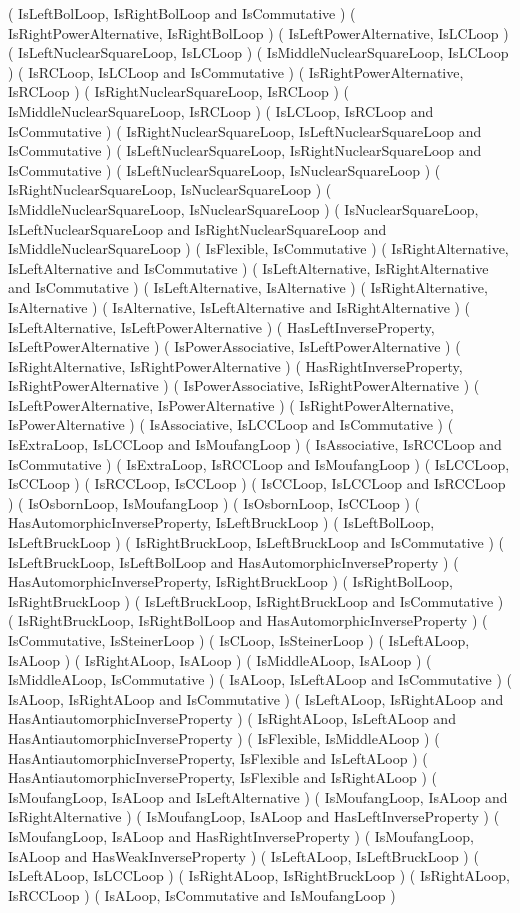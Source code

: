 ( IsLeftBolLoop, IsRightBolLoop and IsCommutative )
( IsRightPowerAlternative, IsRightBolLoop )
( IsLeftPowerAlternative, IsLCLoop )
( IsLeftNuclearSquareLoop, IsLCLoop )
( IsMiddleNuclearSquareLoop, IsLCLoop )
( IsRCLoop, IsLCLoop and IsCommutative )
( IsRightPowerAlternative, IsRCLoop )
( IsRightNuclearSquareLoop, IsRCLoop )
( IsMiddleNuclearSquareLoop, IsRCLoop )
( IsLCLoop, IsRCLoop and IsCommutative )
( IsRightNuclearSquareLoop, IsLeftNuclearSquareLoop and IsCommutative )
( IsLeftNuclearSquareLoop, IsRightNuclearSquareLoop and IsCommutative )
( IsLeftNuclearSquareLoop, IsNuclearSquareLoop )
( IsRightNuclearSquareLoop, IsNuclearSquareLoop )
( IsMiddleNuclearSquareLoop, IsNuclearSquareLoop )
( IsNuclearSquareLoop, IsLeftNuclearSquareLoop
    and IsRightNuclearSquareLoop and IsMiddleNuclearSquareLoop )
( IsFlexible, IsCommutative )
( IsRightAlternative, IsLeftAlternative and IsCommutative )
( IsLeftAlternative, IsRightAlternative and IsCommutative )
( IsLeftAlternative, IsAlternative )
( IsRightAlternative, IsAlternative )
( IsAlternative, IsLeftAlternative and IsRightAlternative )
( IsLeftAlternative, IsLeftPowerAlternative )
( HasLeftInverseProperty, IsLeftPowerAlternative )
( IsPowerAssociative, IsLeftPowerAlternative )
( IsRightAlternative, IsRightPowerAlternative )
( HasRightInverseProperty, IsRightPowerAlternative )
( IsPowerAssociative, IsRightPowerAlternative )
( IsLeftPowerAlternative, IsPowerAlternative )
( IsRightPowerAlternative, IsPowerAlternative )
( IsAssociative, IsLCCLoop and IsCommutative )
( IsExtraLoop, IsLCCLoop and IsMoufangLoop )
( IsAssociative, IsRCCLoop and IsCommutative )
( IsExtraLoop, IsRCCLoop and IsMoufangLoop )
( IsLCCLoop, IsCCLoop )
( IsRCCLoop, IsCCLoop )
( IsCCLoop, IsLCCLoop and IsRCCLoop )
( IsOsbornLoop, IsMoufangLoop )
( IsOsbornLoop, IsCCLoop )
( HasAutomorphicInverseProperty, IsLeftBruckLoop )
( IsLeftBolLoop, IsLeftBruckLoop )
( IsRightBruckLoop, IsLeftBruckLoop and IsCommutative )
( IsLeftBruckLoop, IsLeftBolLoop and HasAutomorphicInverseProperty )
( HasAutomorphicInverseProperty, IsRightBruckLoop )
( IsRightBolLoop, IsRightBruckLoop )
( IsLeftBruckLoop, IsRightBruckLoop and IsCommutative )
( IsRightBruckLoop, IsRightBolLoop and HasAutomorphicInverseProperty )
( IsCommutative, IsSteinerLoop )
( IsCLoop, IsSteinerLoop )
( IsLeftALoop, IsALoop )
( IsRightALoop, IsALoop )
( IsMiddleALoop, IsALoop )
( IsMiddleALoop, IsCommutative )
( IsALoop, IsLeftALoop and IsCommutative )
( IsALoop, IsRightALoop and IsCommutative )
( IsLeftALoop, IsRightALoop and HasAntiautomorphicInverseProperty )
( IsRightALoop, IsLeftALoop and HasAntiautomorphicInverseProperty )
( IsFlexible, IsMiddleALoop )
( HasAntiautomorphicInverseProperty, IsFlexible and IsLeftALoop )
( HasAntiautomorphicInverseProperty, IsFlexible and IsRightALoop )
( IsMoufangLoop, IsALoop and IsLeftAlternative )
( IsMoufangLoop, IsALoop and IsRightAlternative )
( IsMoufangLoop, IsALoop and HasLeftInverseProperty )
( IsMoufangLoop, IsALoop and HasRightInverseProperty )
( IsMoufangLoop, IsALoop and HasWeakInverseProperty )
( IsLeftALoop, IsLeftBruckLoop )
( IsLeftALoop, IsLCCLoop )
( IsRightALoop, IsRightBruckLoop )
( IsRightALoop, IsRCCLoop )
( IsALoop, IsCommutative and IsMoufangLoop )
\endtt
